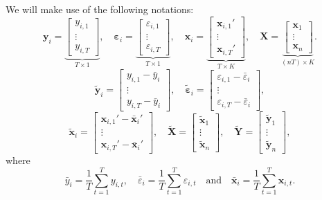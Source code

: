 \documentclass[
  12pt,
]{book}
\theoremstyle{definition}
\theoremstyle{definition}
\theoremstyle{definition}
\theoremstyle{definition}
\theoremstyle{remark}
\begin{document}
We will make use of the following notations:
\[
\mathbf{y}_i =
\underbrace{\left[
\begin{array}{c}
y_{i,1}\\
\vdots\\
y_{i,T}
\end{array}\right]}_{T \times 1}, \quad
\boldsymbol\varepsilon_i =
\underbrace{\left[
\begin{array}{c}
\varepsilon_{i,1}\\
\vdots\\
\varepsilon_{i,T}
\end{array}\right]}_{T \times 1}, \quad
\mathbf{x}_i =
\underbrace{\left[
\begin{array}{c}
\mathbf{x}_{i,1}'\\
\vdots\\
\mathbf{x}_{i,T}'
\end{array}\right]}_{T \times K}, \quad
\mathbf{X} =
\underbrace{\left[
\begin{array}{c}
\mathbf{x}_{1}\\
\vdots\\
\mathbf{x}_{n}
\end{array}\right]}_{(nT) \times K}.
\]
\[
\tilde{\mathbf{y}}_i =
\left[
\begin{array}{c}
y_{i,1} - \bar{y}_i\\
\vdots\\
y_{i,T} - \bar{y}_i
\end{array}\right], \quad
\tilde{\boldsymbol\varepsilon}_i =
\left[
\begin{array}{c}
\varepsilon_{i,1} - \bar{\varepsilon}_i\\
\vdots\\
\varepsilon_{i,T} - \bar{\varepsilon}_i
\end{array}\right],
\]
\[
\tilde{\mathbf{x}}_i =
\left[
\begin{array}{c}
\mathbf{x}_{i,1}' - \bar{\mathbf{x}}_i'\\
\vdots\\
\mathbf{x}_{i,T}' - \bar{\mathbf{x}}_i'
\end{array}\right], \quad
\tilde{\mathbf{X}} =
\left[
\begin{array}{c}
\tilde{\mathbf{x}}_{1}\\
\vdots\\
\tilde{\mathbf{x}}_{n}
\end{array}\right], \quad
\tilde{\mathbf{Y}} =
\left[
\begin{array}{c}
\tilde{\mathbf{y}}_{1}\\
\vdots\\
\tilde{\mathbf{y}}_{n}
\end{array}\right],
\]
where
\[
\bar{y}_i = \frac{1}{T} \sum_{t=1}^T y_{i,t}, \quad \bar{\varepsilon}_i = \frac{1}{T}\sum_{t=1}^T \varepsilon_{i,t} \quad \mbox{and} \quad \bar{\mathbf{x}}_i = \frac{1}{T}\sum_{t=1}^T \mathbf{x}_{i,t}.
\]
\end{document}
